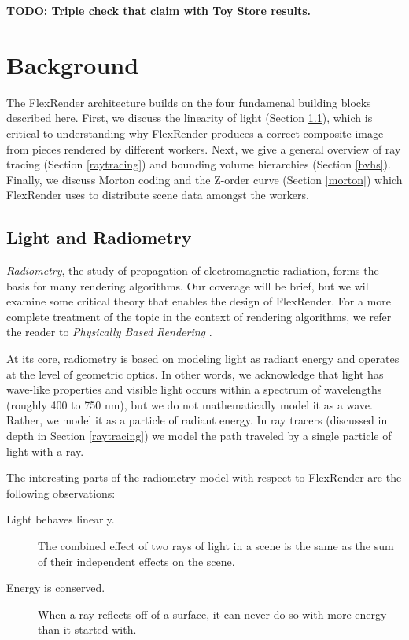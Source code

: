 \documentclass[12pt]{ucthesis}
\begin{document}
\textbf{TODO: Triple check that claim with Toy Store results.}

\chapter{Background}
\label{background}

The FlexRender architecture builds on the four fundamenal building blocks
described here. First, we discuss the linearity of light (Section \ref{radiometry}),
which is critical to understanding why FlexRender produces a correct composite
image from pieces rendered by different workers. Next, we give a general
overview of ray tracing (Section \ref{raytracing}) and bounding volume hierarchies
(Section \ref{bvhs}). Finally, we discuss Morton coding and the Z-order curve
(Section \ref{morton}) which FlexRender uses to distribute scene data amongst the
workers.

\section{Light and Radiometry}
\label{radiometry}

\emph{Radiometry}, the study of propagation of electromagnetic radiation, forms
the basis for many rendering algorithms. Our coverage will be brief, but we will
examine some critical theory that enables the design of FlexRender. For a more
complete treatment of the topic in the context of rendering algorithms, we refer
the reader to \emph{Physically Based Rendering} \cite{pbrt}.

At its core, radiometry is based on modeling light as radiant energy and
operates at the level of geometric optics. In other words, we acknowledge that
light has wave-like properties and visible light occurs within a spectrum of
wavelengths (roughly 400 to 750 nm), but we do not mathematically model it as
a wave. Rather, we model it as a particle of radiant energy. In ray tracers
(discussed in depth in Section \ref{raytracing}) we model the path traveled by a single
particle of light with a ray.

The interesting parts of the radiometry model with respect to FlexRender are the
following observations:

\begin{description}
    \item[Light behaves linearly.] The combined effect of two rays of light
        in a scene is the same as the sum of their independent effects on the
        scene.
    \item[Energy is conserved.] When a ray reflects off of a surface, it can
        never do so with more energy than it started with.
\end{description}
\end{document}
